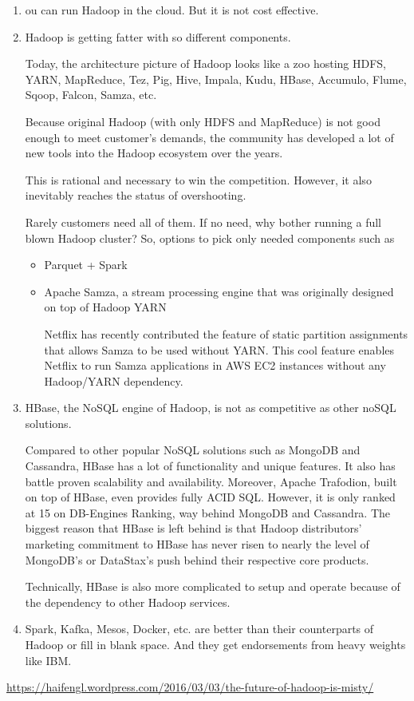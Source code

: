 \begin{enumerate}
  \item ou can run Hadoop in the cloud. But it is not cost effective.

  \item  Hadoop is getting fatter with so different components.
  
  Today, the architecture picture
  of Hadoop looks like a zoo hosting HDFS, YARN, MapReduce, Tez, Pig, Hive,
  Impala, Kudu, HBase, Accumulo, Flume, Sqoop, Falcon, Samza, etc.
  
  Because original Hadoop (with only HDFS and MapReduce) is not good enough to
  meet customer's demands, the community has developed a lot of new tools into
  the Hadoop ecosystem over the years.
  
  This is rational and necessary to win the competition. However, it also
  inevitably reaches the status of overshooting. 
  
  
 Rarely customers need all of them. If no need, why bother running a full blown
 Hadoop cluster? So, options to pick only needed components such as
 \begin{itemize}
   \item  Parquet + Spark
   
   \item Apache Samza, a stream processing engine that was originally designed
   on top of Hadoop YARN
   
   Netflix has recently contributed the feature of static partition assignments
   that allows Samza to be used without YARN. This cool feature enables Netflix
   to run Samza applications in AWS EC2 instances without any Hadoop/YARN
   dependency.
 \end{itemize}
  
  \item HBase, the NoSQL engine of Hadoop, is not as competitive as other noSQL
  solutions.
  
  Compared to other popular NoSQL solutions such as MongoDB and Cassandra, HBase
  has a lot of functionality and unique features. It also has battle proven
  scalability and availability.
  Moreover, Apache Trafodion, built on top of HBase, even provides fully ACID
  SQL. However, it is only ranked at 15 on DB-Engines Ranking, way behind
  MongoDB and Cassandra. The biggest reason that HBase is left behind is that
  Hadoop distributors' marketing commitment to HBase has never risen to nearly
  the level of MongoDB's or DataStax's push behind their respective core
  products.
  
  Technically, HBase is also more complicated to setup and operate because of
  the dependency to other Hadoop services.
  
  \item Spark, Kafka, Mesos, Docker, etc. are better than their counterparts of
  Hadoop or fill in blank space. And they get endorsements from heavy weights
  like IBM. 
\end{enumerate}
\url{https://haifengl.wordpress.com/2016/03/03/the-future-of-hadoop-is-misty/}


